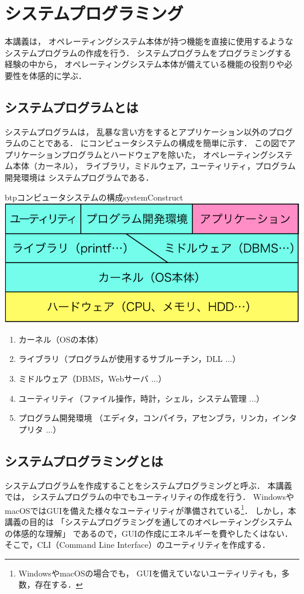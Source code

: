 \chapter{システムプログラミング}

本講義は，
オペレーティングシステム本体が持つ機能を直接に使用するような
システムプログラムの作成を行う．
システムプログラムをプログラミングする経験の中から，
オペレーティングシステム本体が備えている機能の役割りや必要性を体感的に学ぶ．

\section{システムプログラムとは}
システムプログラムは，
乱暴な言い方をするとアプリケーション以外のプログラムのことである．
にコンピュータシステムの構成を簡単に示す．
この図でアプリケーションプログラムとハードウェアを除いた，
オペレーティングシステム本体（カーネル），
ライブラリ，ミドルウェア，ユーティリティ，プログラム開発環境は
システムプログラムである．

\begin{myfig}{btp}{コンピュータシステムの構成}{systemConstruct}
\includegraphics[scale=0.8]{Fig/systemConstruct-crop.pdf}
\end{myfig}

\begin{enumerate}
\item カーネル（OSの本体）
\item ライブラリ（プログラムが使用するサブルーチン，DLL ...）
\item ミドルウェア（DBMS，Webサーバ ...）
\item ユーティリティ（ファイル操作，時計，シェル，システム管理 ...）
\item プログラム開発環境
（エディタ，コンパイラ，アセンブラ，リンカ，インタプリタ ...）
\end{enumerate}

\section{システムプログラミングとは}
システムプログラムを作成することをシステムプログラミングと呼ぶ．
本講義では，
システムプログラムの中でもユーティリティの作成を行う．
WindowsやmacOSではGUIを備えた様々なユーティリティが準備されている\footnote{
WindowsやmacOSの場合でも，
GUIを備えていないユーティリティも，多数，存在する．}．
しかし，本講義の目的は
「システムプログラミングを通してのオペレーティングシステムの体感的な理解」
であるので，GUIの作成にエネルギーを費やしたくはない．
そこで，CLI（Command Line Interface）のユーティリティを作成する．

